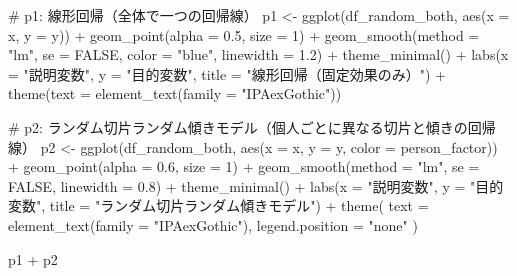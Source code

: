 \documentclass[
  a4paper,
]{ltjsbook}
\newenvironment{Shaded}{\begin{snugshade}}{\end{snugshade}}
\newcommand{\AttributeTok}[1]{\textcolor[rgb]{0.40,0.45,0.13}{#1}}
\newcommand{\CommentTok}[1]{\textcolor[rgb]{0.37,0.37,0.37}{#1}}
\newcommand{\ConstantTok}[1]{\textcolor[rgb]{0.56,0.35,0.01}{#1}}
\newcommand{\DecValTok}[1]{\textcolor[rgb]{0.68,0.00,0.00}{#1}}
\newcommand{\FloatTok}[1]{\textcolor[rgb]{0.68,0.00,0.00}{#1}}
\newcommand{\FunctionTok}[1]{\textcolor[rgb]{0.28,0.35,0.67}{#1}}
\newcommand{\NormalTok}[1]{\textcolor[rgb]{0.00,0.23,0.31}{#1}}
\newcommand{\OtherTok}[1]{\textcolor[rgb]{0.00,0.23,0.31}{#1}}
\newcommand{\SpecialCharTok}[1]{\textcolor[rgb]{0.37,0.37,0.37}{#1}}
\newcommand{\StringTok}[1]{\textcolor[rgb]{0.13,0.47,0.30}{#1}}
\begin{document}
\begin{Shaded}
\begin{Highlighting}[]
\CommentTok{\# p1: 線形回帰（全体で一つの回帰線）}
\NormalTok{p1 }\OtherTok{\textless{}{-}} \FunctionTok{ggplot}\NormalTok{(df\_random\_both, }\FunctionTok{aes}\NormalTok{(}\AttributeTok{x =}\NormalTok{ x, }\AttributeTok{y =}\NormalTok{ y)) }\SpecialCharTok{+}
    \FunctionTok{geom\_point}\NormalTok{(}\AttributeTok{alpha =} \FloatTok{0.5}\NormalTok{, }\AttributeTok{size =} \DecValTok{1}\NormalTok{) }\SpecialCharTok{+}
    \FunctionTok{geom\_smooth}\NormalTok{(}\AttributeTok{method =} \StringTok{"lm"}\NormalTok{, }\AttributeTok{se =} \ConstantTok{FALSE}\NormalTok{, }\AttributeTok{color =} \StringTok{"blue"}\NormalTok{, }\AttributeTok{linewidth =} \FloatTok{1.2}\NormalTok{) }\SpecialCharTok{+}
    \FunctionTok{theme\_minimal}\NormalTok{() }\SpecialCharTok{+}
    \FunctionTok{labs}\NormalTok{(}\AttributeTok{x =} \StringTok{"説明変数"}\NormalTok{, }\AttributeTok{y =} \StringTok{"目的変数"}\NormalTok{, }\AttributeTok{title =} \StringTok{"線形回帰（固定効果のみ）"}\NormalTok{) }\SpecialCharTok{+}
    \FunctionTok{theme}\NormalTok{(}\AttributeTok{text =} \FunctionTok{element\_text}\NormalTok{(}\AttributeTok{family =} \StringTok{"IPAexGothic"}\NormalTok{))}

\CommentTok{\# p2: ランダム切片ランダム傾きモデル（個人ごとに異なる切片と傾きの回帰線）}
\NormalTok{p2 }\OtherTok{\textless{}{-}} \FunctionTok{ggplot}\NormalTok{(df\_random\_both, }\FunctionTok{aes}\NormalTok{(}\AttributeTok{x =}\NormalTok{ x, }\AttributeTok{y =}\NormalTok{ y, }\AttributeTok{color =}\NormalTok{ person\_factor)) }\SpecialCharTok{+}
    \FunctionTok{geom\_point}\NormalTok{(}\AttributeTok{alpha =} \FloatTok{0.6}\NormalTok{, }\AttributeTok{size =} \DecValTok{1}\NormalTok{) }\SpecialCharTok{+}
    \FunctionTok{geom\_smooth}\NormalTok{(}\AttributeTok{method =} \StringTok{"lm"}\NormalTok{, }\AttributeTok{se =} \ConstantTok{FALSE}\NormalTok{, }\AttributeTok{linewidth =} \FloatTok{0.8}\NormalTok{) }\SpecialCharTok{+}
    \FunctionTok{theme\_minimal}\NormalTok{() }\SpecialCharTok{+}
    \FunctionTok{labs}\NormalTok{(}\AttributeTok{x =} \StringTok{"説明変数"}\NormalTok{, }\AttributeTok{y =} \StringTok{"目的変数"}\NormalTok{, }\AttributeTok{title =} \StringTok{"ランダム切片ランダム傾きモデル"}\NormalTok{) }\SpecialCharTok{+}
    \FunctionTok{theme}\NormalTok{(}
      \AttributeTok{text =} \FunctionTok{element\_text}\NormalTok{(}\AttributeTok{family =} \StringTok{"IPAexGothic"}\NormalTok{),}
      \AttributeTok{legend.position =} \StringTok{"none"}
\NormalTok{    )}

\NormalTok{p1 }\SpecialCharTok{+}\NormalTok{ p2}
\end{Highlighting}
\end{Shaded}
\end{document}
